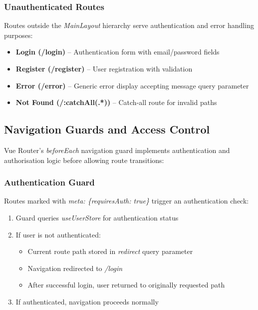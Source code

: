 \subsubsection*{Unauthenticated Routes}

Routes outside the \textit{MainLayout} hierarchy serve authentication and error handling purposes:

\begin{itemize}
    \item \textbf{Login (/login)} – Authentication form with email/password fields
    \item \textbf{Register (/register)} – User registration with validation
    \item \textbf{Error (/error)} – Generic error display accepting message query parameter
    \item \textbf{Not Found (/:catchAll(.*))} – Catch-all route for invalid paths
\end{itemize}

\subsection{Navigation Guards and Access Control}

Vue Router's \textit{beforeEach} navigation guard implements authentication and authorisation logic before allowing route transitions:

\subsubsection*{Authentication Guard}
Routes marked with \textit{meta: \{requiresAuth: true\}} trigger an authentication check:
\begin{enumerate}
    \item Guard queries \textit{useUserStore} for authentication status
    \item If user is not authenticated:
    \begin{itemize}
        \item Current route path stored in \textit{redirect} query parameter
        \item Navigation redirected to \textit{/login}
        \item After successful login, user returned to originally requested path
    \end{itemize}
    \item If authenticated, navigation proceeds normally
\end{enumerate}

